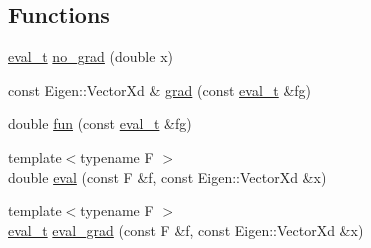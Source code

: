 \subsection*{Functions}
\begin{DoxyCompactItemize}
\item 
\hyperlink{group__opt__tools_ga362b55973a38ac71f27a06f9d9c14f24}{eval\+\_\+t} \hyperlink{group__opt__tools_ga38e53ccac21f452bd31e9b239985d456}{no\+\_\+grad} (double x)
\item 
const Eigen\+::\+Vector\+Xd \& \hyperlink{group__opt__tools_gaf28d9af930b2993024ab497b285e0521}{grad} (const \hyperlink{group__opt__tools_ga362b55973a38ac71f27a06f9d9c14f24}{eval\+\_\+t} \&fg)
\item 
double \hyperlink{group__opt__tools_ga68ad00d7501bc26a2a0990bac762393e}{fun} (const \hyperlink{group__opt__tools_ga362b55973a38ac71f27a06f9d9c14f24}{eval\+\_\+t} \&fg)
\item 
{\footnotesize template$<$typename F $>$ }\\double \hyperlink{group__opt__tools_ga698d932ac52cab812742b1300f875372}{eval} (const F \&f, const Eigen\+::\+Vector\+Xd \&x)
\item 
{\footnotesize template$<$typename F $>$ }\\\hyperlink{group__opt__tools_ga362b55973a38ac71f27a06f9d9c14f24}{eval\+\_\+t} \hyperlink{group__opt__tools_ga6abbcdf8d83abca89802881d883fb9e3}{eval\+\_\+grad} (const F \&f, const Eigen\+::\+Vector\+Xd \&x)
\end{DoxyCompactItemize}
